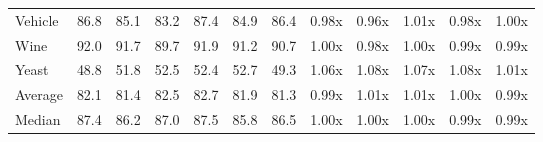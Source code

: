 \begin{tabular}{llllllllllll}
Vehicle             &     86.8 &  85.1 &  83.2 &  87.4 &  84.9 &  86.4 &    0.98x &  0.96x &  1.01x &  0.98x &  1.00x \\
Wine                &     92.0 &  91.7 &  89.7 &  91.9 &  91.2 &  90.7 &    1.00x &  0.98x &  1.00x &  0.99x &  0.99x \\
Yeast               &     48.8 &  51.8 &  52.5 &  52.4 &  52.7 &  49.3 &    1.06x &  1.08x &  1.07x &  1.08x &  1.01x \\
Average             &     82.1 &  81.4 &  82.5 &  82.7 &  81.9 &  81.3 &    0.99x &  1.01x &  1.01x &  1.00x &  0.99x \\
Median              &     87.4 &  86.2 &  87.0 &  87.5 &  85.8 &  86.5 &    1.00x &  1.00x &  1.00x &  0.99x &  0.99x \\
\bottomrule
\end{tabular}
